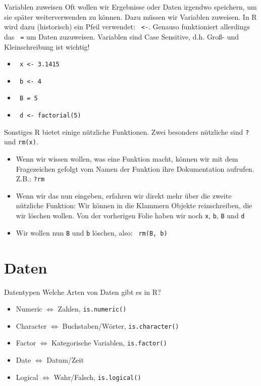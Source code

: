 \documentclass[xcolor=dvipsnames, aspectratio = 169]{beamer}
\begin{document}
\begin{frame}[fragile]{Variablen zuweisen}
Oft wollen wir Ergebnisse oder Daten irgendwo speichern, um sie später weiterverwenden zu können. Dazu müssen wir Variablen zuweisen. In R wird dazu (historisch) ein Pfeil verwendet: \verb+ <-+. Genauso funktioniert allerdings das \verb+ =+ um Daten zuzuweisen. Variablen sind \glqq Case Sensitive\grqq{}, d.h. Groß- und Kleinschreibung ist wichtig!
\begin{itemize}
	\item \verb+ x <- 3.1415+
	\item \verb+ b <- 4+
	\item \verb+ B = 5+
	\item \verb+ d <- factorial(5)+
\end{itemize}
\end{frame}

\begin{frame}[fragile]{Sonstiges}
R bietet einige nützliche Funktionen. Zwei besonders nützliche sind \verb+?+ und \verb+rm(x)+.
\begin{itemize}
	\item Wenn wir wissen wollen, was eine Funktion macht, können wir mit dem Fragezeichen gefolgt vom Namen der Funktion ihre Dokumentation aufrufen. Z.B.: \verb+?rm+
	\item Wenn wir das nun eingeben, erfahren wir direkt mehr über die zweite nützliche Funktion: Wir können in die Klammern Objekte reinschreiben, die wir löschen wollen. Von der vorherigen Folie haben wir noch \verb+x+, \verb+b+, \verb+B+ und \verb+d+
	\item Wir wollen nun \verb+B+ und \verb+b+ löschen, also: \verb+ rm(B, b)+
\end{itemize}
\end{frame}

\section{Daten}
\begin{frame}[fragile]{Datentypen}
	Welche Arten von Daten gibt es in R?
	\begin{itemize}
		\item Numeric $\Leftrightarrow$ Zahlen, \verb+is.numeric()+
		\item Character $\Leftrightarrow$ Buchstaben/Wörter, \verb+is.character()+
		\item Factor $\Leftrightarrow$ Kategorische Variablen, \verb+is.factor()+
		\item Date $\Leftrightarrow$ Datum/Zeit
		\item Logical $\Leftrightarrow$ Wahr/Falsch, \verb+is.logical()+
	\end{itemize}
\end{frame}
\end{document}
